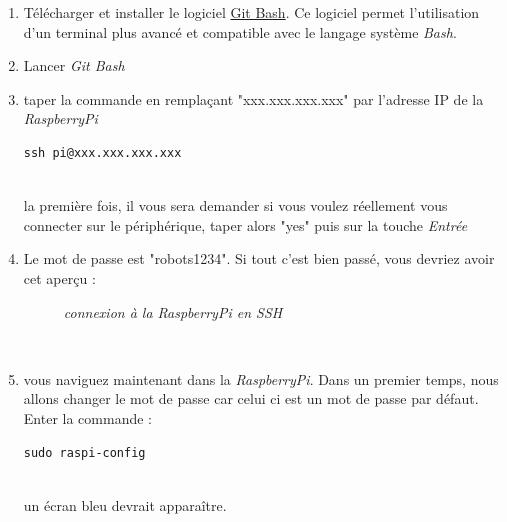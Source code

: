 \begin{enumerate}
\begin{enumerate} 
	\item Télécharger et installer le logiciel \href{https://git-for-windows.github.io/}{Git Bash}. Ce logiciel permet l'utilisation d'un terminal plus avancé et compatible avec le langage système \textit{Bash}.
	\item Lancer \textit{Git Bash}
	\item taper la commande en remplaçant "xxx.xxx.xxx.xxx" par l'adresse IP de la \textit{RaspberryPi}\\
	\begin{lstlisting}[style=MyBashStyle]
	ssh pi@xxx.xxx.xxx.xxx
	\end{lstlisting}\\
la première fois, il vous sera demander si vous voulez réellement vous connecter sur le périphérique, taper alors "yes" puis sur la touche \textit{Entrée}
	\item Le mot de passe est "robots1234". Si tout c'est bien passé, vous devriez avoir cet aperçu :\\
	\begin{figure}[H]
	\begin{center}
	\end{center}
		\caption{ \textit{connexion à la RaspberryPi en SSH}}
	\end{figure}\\
	
	\item vous naviguez maintenant dans la \textit{RaspberryPi}. Dans un premier temps, nous allons changer le mot de passe car celui ci est un mot de passe par défaut. Enter la commande :\\
	\begin{lstlisting}[style=MyBashStyle]
	sudo raspi-config
	\end{lstlisting}\\
	un écran bleu devrait apparaître. %
	

\end{enumerate}
\end{enumerate}
